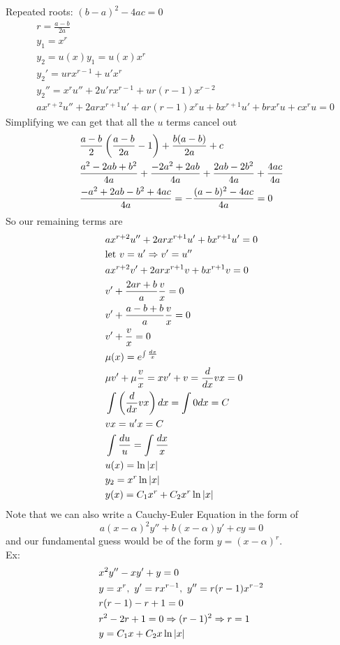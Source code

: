 \documentclass[11pt, fleqn]{article}
\begin{document}
Repeated roots: $(b-a)^2-4ac=0$
\begin{align*}
    &r=\frac{a-b}{2a}\\
    &y_1=x^{r}\\
    &y_2=u(x)y_1=u(x)x^r\\
    &y_2'=urx^{r-1}+u'x^r\\
    &y_2''=x^ru''+2u'rx^{r-1}+ur(r-1)x^{r-2}\\
    &ax^{r+2}u''+2arx^{r+1}u'+ar(r-1)x^ru+bx^{r+1}u'+brx^ru+cx^ru=0
\end{align*}
Simplifying we can get that all the $u$ terms cancel out
\begin{align*}
    &\frac{a-b}{2}\left( \frac{a-b}{2a}-1 \right)+\frac{b(a-b)}{2a}+c\\
    &\frac{a^2-2ab+b^2}{4a}+\frac{-2a^2+2ab}{4a}+\frac{2ab-2b^2}{4a}+\frac{4ac}{4a}\\
    &\frac{-a^2+2ab-b^2+4ac}{4a}=-\frac{(a-b)^2-4ac}{4a}=0
\end{align*}
So our remaining terms are
\begin{align*}
    &ax^{r+2}u''+2arx^{r+1}u'+bx^{r+1}u'=0\\
    &\text{let }v=u'\Rightarrow v'=u''\\
    &ax^{r+2}v'+2arx^{r+1}v+bx^{r+1}v=0\\
    &v'+\frac{2ar+b}{a}\frac{v}{x}=0\\
    &v'+\frac{a-b+b}{a}\frac{v}{x}=0\\
    &v'+\frac{v}{x}=0\\
    &\mu(x)=e^{\int\frac{dx}{x}}\\
    &\mu v'+\mu\frac{v}{x}=xv'+v=\frac{d}{dx}vx=0\\
    &\int\left( \frac{d}{dx}vx \right)dx=\int0dx=C\\
    &vx=u'x=C\\
    &\int\frac{du}{u}=\int\frac{dx}{x}\\
    &u(x)=\ln|x|\\
    &y_2=x^r\ln|x|\\
    &y(x)=C_1x^r+C_2x^r\ln|x|
\end{align*}
Note that we can also write a Cauchy-Euler Equation in the form of
$$a(x-\alpha)^2y''+b(x-\alpha)y'+cy=0$$
and our fundamental guess would be of the form $y=(x-\alpha)^r$.\\
Ex:
\begin{align*}
    &x^2y''-xy'+y=0\\
    &y=x^r,\ y'=rx^{r-1},\ y''=r(r-1)x^{r-2}\\
    &r(r-1)-r+1=0\\
    &r^2-2r+1=0\Rightarrow (r-1)^2\Rightarrow r=1\\
    &y=C_1x+C_2x\ln|x|
\end{align*}
\end{document}
